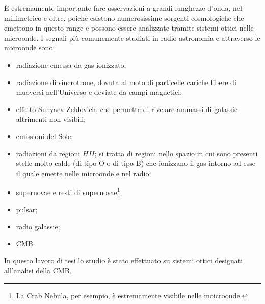 \documentclass[12pt,a4paper,final]{book}
\begin{document}
\`E estremamente importante fare osservazioni a grandi lunghezze d'onda, nel millimetrico e oltre, poichè esistono numerosissime sorgenti cosmologiche che emettono in questo range e possono essere analizzate tramite sistemi ottici nelle microonde.
I segnali più comunemente studiati in radio astronomia e attraverso le microonde sono:
\begin{itemize}
	\item radiazione emessa da gas ionizzato;
	\item radiazione di sincrotrone, dovuta al moto di particelle cariche libere di muoversi nell'Universo e deviate da campi magnetici;
	\item effetto Sunyaev-Zeldovich, che permette di rivelare ammassi di galassie altrimenti non visibili;
	\item emissioni del Sole;
	\item radiazioni da regioni $H II$; si tratta di regioni nello spazio in cui sono presenti stelle molto calde (di tipo O o di tipo B) che ionizzano il gas intorno ad esse il quale emette nelle microonde e nel radio;
	\item supernovae e resti di supernovae\footnote{La Crab Nebula, per esempio, è estremamente visibile nelle moicroonde.};
	\item pulsar;
	\item radio galassie;
	\item CMB.
\end{itemize}
In questo lavoro di tesi lo studio è stato effettuato su sistemi ottici designati all'analisi della CMB.
\end{document}
